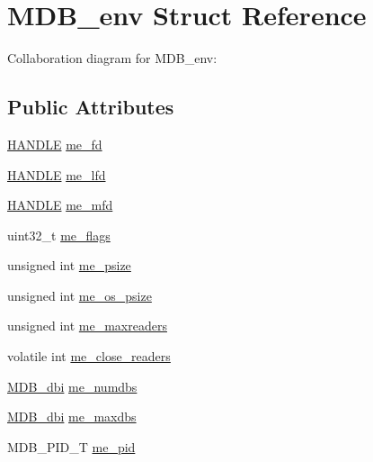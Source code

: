 \hypertarget{struct_m_d_b__env}{}\section{M\+D\+B\+\_\+env Struct Reference}
\label{struct_m_d_b__env}


Collaboration diagram for M\+D\+B\+\_\+env\+:
\subsection*{Public Attributes}
\begin{DoxyCompactItemize}
\item 
\mbox{\hyperlink{group__compat_gab521aa5010fb1afb801a899a55569e03}{H\+A\+N\+D\+LE}} \mbox{\hyperlink{struct_m_d_b__env_adff94c258f5af201410ef61e51a2f8a0}{me\+\_\+fd}}
\item 
\mbox{\hyperlink{group__compat_gab521aa5010fb1afb801a899a55569e03}{H\+A\+N\+D\+LE}} \mbox{\hyperlink{struct_m_d_b__env_a74decfb0ded4cd870c8fafe0208abefc}{me\+\_\+lfd}}
\item 
\mbox{\hyperlink{group__compat_gab521aa5010fb1afb801a899a55569e03}{H\+A\+N\+D\+LE}} \mbox{\hyperlink{struct_m_d_b__env_a8c5f5f596781bc4d39f0e76f244930b7}{me\+\_\+mfd}}
\item 
uint32\+\_\+t \mbox{\hyperlink{struct_m_d_b__env_aaa9e268acef9c8f260ec10e967f12b58}{me\+\_\+flags}}
\item 
unsigned int \mbox{\hyperlink{struct_m_d_b__env_afdddd82c8660afbdbe45fd7e5353ec53}{me\+\_\+psize}}
\item 
unsigned int \mbox{\hyperlink{struct_m_d_b__env_ae79524ce1389402e6c5065472b63a64d}{me\+\_\+os\+\_\+psize}}
\item 
unsigned int \mbox{\hyperlink{struct_m_d_b__env_a9049837fe4c45b663201ac4e078eaf19}{me\+\_\+maxreaders}}
\item 
volatile int \mbox{\hyperlink{struct_m_d_b__env_a65a505dc850aa444442b4cbe1d3eaa3d}{me\+\_\+close\+\_\+readers}}
\item 
\mbox{\hyperlink{group__mdb_gadbe68a06c448dfb62da16443d251a78b}{M\+D\+B\+\_\+dbi}} \mbox{\hyperlink{struct_m_d_b__env_ac34d9780c87bbf2d69bab073bb1964bd}{me\+\_\+numdbs}}
\item 
\mbox{\hyperlink{group__mdb_gadbe68a06c448dfb62da16443d251a78b}{M\+D\+B\+\_\+dbi}} \mbox{\hyperlink{struct_m_d_b__env_ad34d8970e43557e28d1db2df5ffc6d8c}{me\+\_\+maxdbs}}
\item 
M\+D\+B\+\_\+\+P\+I\+D\+\_\+T \mbox{\hyperlink{struct_m_d_b__env_a417b6c74fbbde9f6474358517c577a96}{me\+\_\+pid}}

\end{DoxyCompactItemize}
